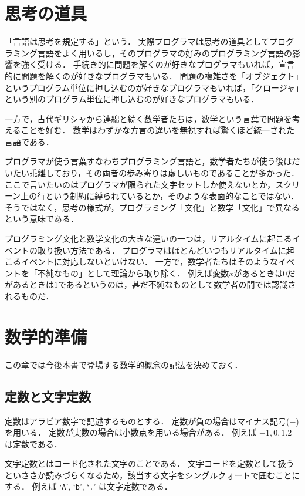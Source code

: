 \documentclass[twocolumn]{jsbook}
\newcommand{\charlit}[1]{\texttt{#1}}
\begin{document}
\chapter{思考の道具}

「言語は思考を規定する」という．
実際プログラマは思考の道具としてプログラミング言語をよく用いるし，そのプログラマの好みのプログラミング言語の影響を強く受ける．
手続き的に問題を解くのが好きなプログラマもいれば，宣言的に問題を解くのが好きなプログラマもいる．
問題の複雑さを「オブジェクト」というプログラム単位に押し込むのが好きなプログラマもいれば，「クロージャ」という別のプログラム単位に押し込むのが好きなプログラマもいる．

一方で，古代ギリシャから連綿と続く数学者たちは，数学という言葉で問題を考えることを好む．
数学はわずかな方言の違いを無視すれば驚くほど統一された言語である．

プログラマが使う言葉すなわちプログラミング言語と，数学者たちが使う後はだいたい乖離しており，その両者の歩み寄りは虚しいものであることが多かった．
ここで言いたいのはプログラマが限られた文字セットしか使えないとか，スクリーン上の行という制約に縛られているとか，そのような表面的なことではない．
そうではなく，思考の様式が，プログラミング「文化」と数学「文化」で異なるという意味である．

プログラミング文化と数学文化の大きな違いの一つは，リアルタイムに起こるイベントの取り扱い方法である．
プログラマはほとんどいつもリアルタイムに起こるイベントに対応しないといけない．
一方で，数学者たちはそのようなイベントを「不純なもの」として理論から取り除く．
例えば変数$x$があるときは$0$だがあるときは$1$であるというのは，甚だ不純なものとして数学者の間では認識されるものだ．

\chapter{数学的準備}

この章では今後本書で登場する数学的概念の記法を決めておく．

\section{定数と文字定数}

定数はアラビア数字で記述するものとする．
定数が負の場合はマイナス記号($-$)を用いる．
定数が実数の場合は小数点を用いる場合がある．
例えば $-1, 0, 1.2$ は定数である．

文字定数とはコード化された文字のことである．
文字コードを定数として扱うといささか読みづらくなるため，該当する文字をシングルクォートで囲むことにする．
例えば `\charlit{A}', `\charlit{b}', `\charlit{.}' は文字定数である．
\end{document}
